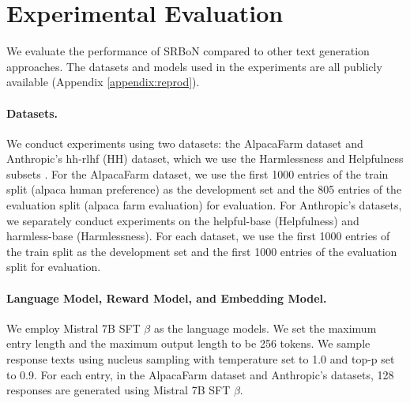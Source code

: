 \section{Experimental Evaluation}\label{sec:exp}

We evaluate the performance of SRBoN compared to other text generation approaches.
The datasets and models used in the experiments are all publicly available (Appendix \ref{appendix:reprod}).

\paragraph{Datasets.}
We conduct experiments using two datasets: the AlpacaFarm dataset \citep{NEURIPS2023_5fc47800} and Anthropic’s hh-rlhf (HH) dataset, which we use the Harmlessness and Helpfulness subsets \citep{bai2022training}. 
For the AlpacaFarm dataset, we use the first 1000 entries
of the train split (alpaca human preference) as the development set and the 805 entries of the evaluation split (alpaca farm evaluation) for evaluation. For Anthropic’s datasets, we separately
conduct experiments on the helpful-base (Helpfulness) and harmless-base (Harmlessness). For each dataset, we use the first 1000 entries of the train split as the development set and the first 1000 entries of the evaluation split for evaluation. 


\paragraph{Language Model, Reward Model, and Embedding Model.}
We employ Mistral 7B SFT $\beta$ \citep{jiang2023mistral} as the language models. 
We set the maximum entry length and the maximum output length to be 256 tokens. We sample response texts using nucleus sampling \citep{Holtzman2020The} with temperature set to 1.0 and top-p set to 0.9.
For each entry, in the AlpacaFarm dataset and Anthropic’s datasets, 128 responses are generated using Mistral 7B SFT $\beta$.


